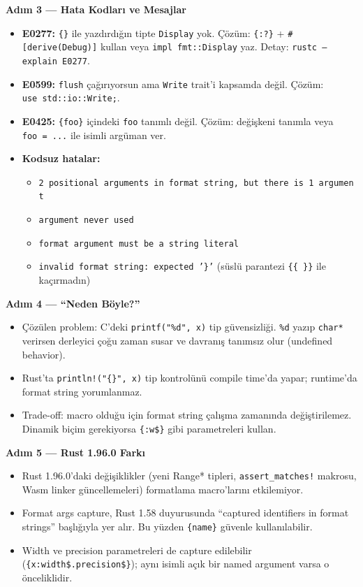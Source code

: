 \documentclass[12pt,a4paper]{article}
\begin{document}
\textbf{Adım 3 --- Hata Kodları ve Mesajlar}

\begin{itemize}
\tightlist
\item
  \textbf{E0277:} \texttt{\{\}} ile yazdırdığın tipte \texttt{Display} yok. Çözüm: \texttt{\{:?\}} + \texttt{\#{[}derive(Debug){]}} kullan veya \texttt{impl\ fmt::Display} yaz. Detay: \texttt{rustc\ --explain\ E0277}.
\item
  \textbf{E0599:} \texttt{flush} çağırıyorsun ama \texttt{Write} trait'i kapsamda değil. Çözüm: \texttt{use\ std::io::Write;}.
\item
  \textbf{E0425:} \texttt{\{foo\}} içindeki \texttt{foo} tanımlı değil. Çözüm: değişkeni tanımla veya \texttt{foo\ =\ ...} ile isimli argüman ver.
\item
  \textbf{Kodsuz hatalar:}

  \begin{itemize}
  \tightlist
  \item
    \texttt{2\ positional\ arguments\ in\ format\ string,\ but\ there\ is\ 1\ argument}
  \item
    \texttt{argument\ never\ used}
  \item
    \texttt{format\ argument\ must\ be\ a\ string\ literal}
  \item
    \texttt{invalid\ format\ string:\ expected\ '\}'} (süslü parantezi \texttt{\{\{\ \}\}} ile kaçırmadın)
  \end{itemize}
\end{itemize}

\textbf{Adım 4 --- ``Neden Böyle?''}

\begin{itemize}
\tightlist
\item
  Çözülen problem: C'deki \texttt{printf("\%d",\ x)} tip güvensizliği. \texttt{\%d} yazıp \texttt{char*} verirsen derleyici çoğu zaman susar ve davranış tanımsız olur (undefined behavior).
\item
  Rust'ta \texttt{println!("\{\}",\ x)} tip kontrolünü compile time'da yapar; runtime'da format string yorumlanmaz.
\item
  Trade-off: macro olduğu için format string çalışma zamanında değiştirilemez. Dinamik biçim gerekiyorsa \texttt{\{:w\$\}} gibi parametreleri kullan.
\end{itemize}

\textbf{Adım 5 --- Rust 1.96.0 Farkı}

\begin{itemize}
\tightlist
\item
  Rust 1.96.0'daki değişiklikler (yeni Range* tipleri, \texttt{assert\_matches!} makrosu, Wasm linker güncellemeleri) formatlama macro'larını etkilemiyor.
\item
  Format args capture, Rust 1.58 duyurusunda ``captured identifiers in format strings'' başlığıyla yer alır. Bu yüzden \texttt{\{name\}} güvenle kullanılabilir.
\item
  Width ve precision parametreleri de capture edilebilir (\texttt{\{x:width\$.precision\$\}}); aynı isimli açık bir named argument varsa o önceliklidir.
\end{itemize}
\end{document}
